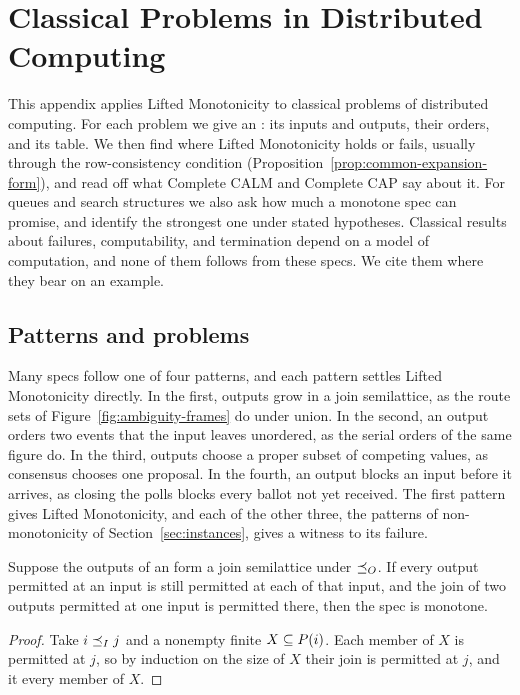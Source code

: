 \section{Classical Problems in Distributed Computing}
\label{app:additional-applications}

This appendix applies Lifted Monotonicity to classical problems of
distributed computing.  For each problem we give an \spectype: its inputs and
outputs, their orders, and its table.  We then find where Lifted Monotonicity
holds or fails, usually through the row-consistency condition
(Proposition~\ref{prop:common-expansion-form}), and read off what Complete
CALM and Complete CAP say about it.  For queues and search structures we also
ask how much a monotone spec can promise, and identify the strongest one under
stated hypotheses.  Classical results about failures, computability, and
termination depend on a model of computation, and none of them follows from
these specs.  We cite them where they bear on an example.

\subsection{Patterns and problems}
\label{app:classical-patterns}

Many specs follow one of four patterns, and each pattern settles Lifted
Monotonicity directly.  In the first, outputs grow in a join semilattice, as
the route sets of Figure~\ref{fig:ambiguity-frames} do under union.  In the
second, an output orders two events that the input leaves unordered, as the
serial orders of the same figure do.  In the third, outputs choose a proper
subset of competing values, as consensus chooses one proposal.  In the fourth,
an output blocks an input before it arrives, as closing the polls blocks every
ballot not yet received.  The first pattern gives Lifted Monotonicity, and
each of the other three, the patterns of non-monotonicity of
Section~\ref{sec:instances}, gives a witness to its failure.

\begin{lemma}
\label{lem:accumulating}
Suppose the outputs of an \spectype form a join semilattice under
$\preceq_O$.  If every output permitted at an input is still permitted at each
\indesc of that input, and the join of two outputs permitted at one input is
permitted there, then the spec is monotone.
\end{lemma}

\begin{proof}
Take $i\preceq_I j$ and a nonempty finite $X\subseteq P(i)$.  Each member
of $X$ is permitted at $j$, so by induction on the size of $X$ their join is
permitted at $j$, and it \outrel every member of $X$.
\end{proof}

